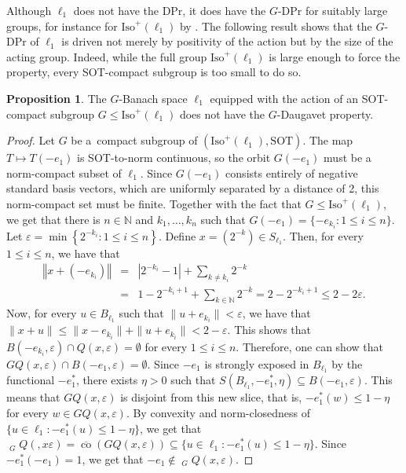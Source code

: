 \documentclass[a4paper,12pt]{amsart}
\theoremstyle{definition}
\newtheorem{proposition}[theorem]{Proposition}
\theoremstyle{definition}
\theoremstyle{remark}
\numberwithin{equation}{section}
\newcommand{\N}{\mathbb{N}}
\newcommand{\clco}{\mathop{\overline{\mathrm{co}}}\nolimits}
\newcommand{\Iso}{\mathrm{Iso}}
\DeclareMathOperator{\co}{co}
\renewcommand{\leq}{\leqslant}
\newcommand{\<}{\langle}
\renewcommand{\>}{\rangle}
\newcommand{\norm}[1]{\left\Vert#1\right\Vert}
\newcommand{\abs}[1]{\left\vert#1\right\vert}
\newcommand{\e}{\varepsilon}
\newcommand{\eps}{\e}
\begin{document}
	Although $\ell_1$ does not have the DPr, it does have the $G$-DPr for suitably large groups, for instance for $\Iso^+(\ell_1)$ by . The following result shows that the $G$-DPr of $\ell_1$ is driven not merely by positivity of the action but by the size of the acting group. Indeed, while the full group $\Iso^+(\ell_1)$ is large enough to force the property, every SOT-compact subgroup is too small to do so.
	
	\begin{proposition}
		The $G$-Banach space $\ell_1$ equipped with the action of an SOT-compact subgroup $G \leq \Iso^+(\ell_1)$ does not have the $G$-Daugavet property.
	\end{proposition}
	\begin{proof}
		Let $G$ be a~compact subgroup of $(\Iso^+(\ell_1), \mathrm{SOT})$. The map $T \mapsto T(-e_1)$ is SOT-to-norm continuous, 
		so the orbit $G(-e_1)$ must be a norm-compact subset of $\ell_1$. Since $G(-e_1)$ consists entirely of negative standard basis vectors, which are uniformly separated by a distance of 2, this norm-compact set must be finite.
		Together with the fact that $G \leq \Iso^+(\ell_1)$, we get that there is $n \in \N$ and $k_1, \dots, k_n$ such that $G(-e_1) = \{-e_{k_i}: 1 \leq i \leq n\}$. Let $\eps = \min \left\{ 2^{-k_i} : 1 \leq i \leq n \right\}$. Define $x = (2^{-k}) \in S_{\ell_1}$. Then, for every $1 \leq i \leq n$, we have that
		\begin{eqnarray*}
			\norm{x + (-e_{k_i})}
			&=& \abs{2^{-k_i} - 1} + \sum_{k \neq k_i} 2^{-k} \\
			&=& 1 - 2^{-k_i+1} + \sum_{k \in \N} 2^{-k} 
			= 2 - 2^{-k_i+1}
			\leq 2 - 2\eps.
		\end{eqnarray*}
		Now, for every $u \in B_{\ell_1}$ such that $\|u+e_{k_i}\| < \e$, we have that $\|x+u\| \leq \|x - e_{k_i}\| + \|u+e_{k_i}\| < 2 - \e$. This shows that $B(-e_{k_i}, \e) \cap Q(x, \e) = \emptyset$ for every $1 \leq i \leq n$. Therefore, one can show that $G Q(x, \e) \cap B(-e_1, \e) = \emptyset$. Since $-e_1$ is strongly exposed in $B_{\ell_1}$ by the functional $-e_1^*$, there exists $\eta > 0$ such that $S(B_{\ell_1}, -e_1^*, \eta) \subseteq B(-e_1, \e)$. This means that $GQ(x,\e)$ is disjoint from this new slice, that is, $-e_1^*(w) \leq 1 - \eta$ for every $w \in GQ(x, \e)$. By convexity and norm-closedness of $\{u \in \ell_1: -e_1^*(u) \leq 1 - \eta\}$, we get that $\clco_G Q(,x\e) = \overline{\co}(GQ(x, \e)) \subseteq \{ u \in \ell_1: -e_1^*(u) \leq 1 - \eta\}$. Since $-e_1^*(-e_1) = 1$, we get that $-e_1 \not\in \clco_G Q(x, \e)$.
		
	\end{proof}
	
\end{document}
